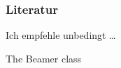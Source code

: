 \begin{frame}
\frametitle{Literatur}

Ich empfehle unbedingt \dots

\bigskip

\begin{thebibliography}{xxx}
 The Beamer class
\end{thebibliography}
\end{frame}
